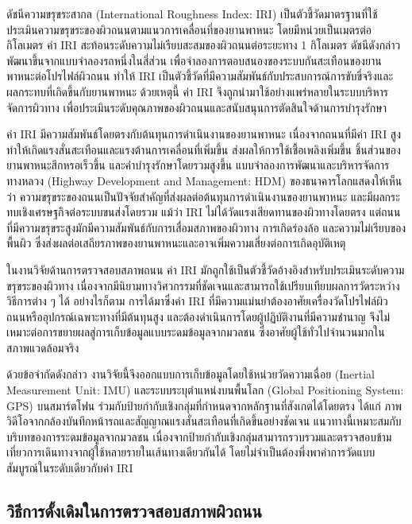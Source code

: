 ดัชนีความขรุขระสากล (International Roughness Index: IRI) เป็นตัวชี้วัดมาตรฐานที่ใช้ประเมินความขรุขระของผิวถนนตามแนวการเคลื่อนที่ของยานพาหนะ โดยมีหน่วยเป็นเมตรต่อกิโลเมตร ค่า IRI สะท้อนระดับความไม่เรียบสะสมของผิวถนนต่อระยะทาง 1 กิโลเมตร ดัชนีดังกล่าวพัฒนาขึ้นจากแบบจำลองรถหนึ่งในสี่ส่วน เพื่อจำลองการตอบสนองของระบบกันสะเทือนของยานพาหนะต่อโปรไฟล์ผิวถนน ทำให้ IRI เป็นตัวชี้วัดที่มีความสัมพันธ์กับประสบการณ์การขับขี่จริงและผลกระทบที่เกิดขึ้นกับยานพาหนะ \parencite{sayers1986roughness} ด้วยเหตุนี้ ค่า IRI จึงถูกนำมาใช้อย่างแพร่หลายในระบบบริหารจัดการผิวทาง เพื่อประเมินระดับคุณภาพของผิวถนนและสนับสนุนการตัดสินใจด้านการบำรุงรักษา

ค่า IRI มีความสัมพันธ์โดยตรงกับต้นทุนการดำเนินงานของยานพาหนะ เนื่องจากถนนที่มีค่า IRI สูงทำให้เกิดแรงสั่นสะเทือนและแรงต้านการเคลื่อนที่เพิ่มขึ้น ส่งผลให้การใช้เชื้อเพลิงเพิ่มขึ้น ชิ้นส่วนของยานพาหนะสึกหรอเร็วขึ้น และค่าบำรุงรักษาโดยรวมสูงขึ้น แบบจำลองการพัฒนาและบริหารจัดการทางหลวง (Highway Development and Management: HDM) ของธนาคารโลกแสดงให้เห็นว่า ความขรุขระของถนนเป็นปัจจัยสำคัญที่ส่งผลต่อต้นทุนการดำเนินงานของยานพาหนะ และมีผลกระทบเชิงเศรษฐกิจต่อระบบขนส่งโดยรวม \parencite{sayers1986roughness} แม้ว่า IRI ไม่ได้วัดแรงเสียดทานของผิวทางโดยตรง แต่ถนนที่มีความขรุขระสูงมักมีความสัมพันธ์กับการเสื่อมสภาพของผิวทาง การเกิดร่องล้อ และความไม่เรียบของพื้นผิว ซึ่งส่งผลต่อเสถียรภาพของยานพาหนะและอาจเพิ่มความเสี่ยงต่อการเกิดอุบัติเหตุ \parencite{fhwa2016}

ในงานวิจัยด้านการตรวจสอบสภาพถนน ค่า IRI มักถูกใช้เป็นตัวชี้วัดอ้างอิงสำหรับประเมินระดับความขรุขระของผิวทาง เนื่องจากมีนิยามทางวิศวกรรมที่ชัดเจนและสามารถใช้เปรียบเทียบผลการวัดระหว่างวิธีการต่าง ๆ ได้ อย่างไรก็ตาม การได้มาซึ่งค่า IRI ที่มีความแม่นยำต้องอาศัยเครื่องวัดโปรไฟล์ผิวถนนหรืออุปกรณ์เฉพาะทางที่มีต้นทุนสูง และต้องดำเนินการโดยผู้ปฏิบัติงานที่มีความชำนาญ จึงไม่เหมาะต่อการขยายผลสู่การเก็บข้อมูลแบบระดมข้อมูลจากมวลชน ซึ่งอาศัยผู้ใช้ทั่วไปจำนวนมากในสภาพแวดล้อมจริง

ด้วยข้อจำกัดดังกล่าว งานวิจัยนี้จึงออกแบบการเก็บข้อมูลโดยใช้หน่วยวัดความเฉื่อย (Inertial Measurement Unit: IMU) และระบบระบุตำแหน่งบนพื้นโลก (Global Positioning System: GPS) บนสมาร์ตโฟน ร่วมกับป้ายกำกับเชิงกลุ่มที่กำหนดจากหลักฐานที่สังเกตได้โดยตรง ได้แก่ ภาพวิดีโอจากกล้องบันทึกหน้ารถและสัญญาณแรงสั่นสะเทือนที่เกิดขึ้นอย่างชัดเจน แนวทางนี้เหมาะสมกับบริบทของการระดมข้อมูลจากมวลชน เนื่องจากป้ายกำกับเชิงกลุ่มสามารถรวบรวมและตรวจสอบข้ามเที่ยวการเดินทางจากผู้ใช้หลายรายในเส้นทางเดียวกันได้ โดยไม่จำเป็นต้องพึ่งพาค่าการวัดแบบสัมบูรณ์ในระดับเดียวกับค่า IRI

\subsection{วิธีการดั้งเดิมในการตรวจสอบสภาพผิวถนน}

